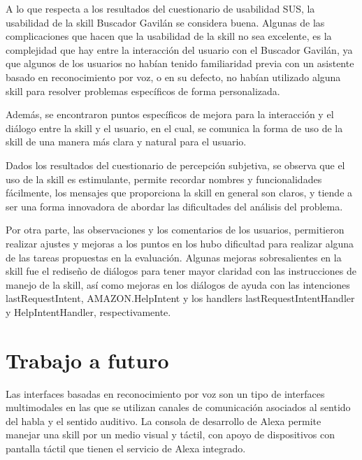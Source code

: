 A lo que respecta a los resultados del cuestionario de usabilidad SUS, la usabilidad de la skill Buscador Gavilán se considera buena. Algunas de las complicaciones que hacen que la usabilidad de la skill no sea excelente, es la complejidad que hay entre la interacción del usuario con el Buscador Gavilán, ya que algunos de los usuarios no habían tenido familiaridad previa con un asistente basado en reconocimiento por voz, o en su defecto, no habían utilizado alguna skill para resolver problemas específicos de forma personalizada.

Además, se encontraron puntos específicos de mejora para la interacción y el diálogo entre la skill y el usuario, en el cual, se comunica la forma de uso de la skill de una manera más clara y natural para el usuario.

Dados los resultados del cuestionario de percepción subjetiva, se observa que el uso de la skill es estimulante, permite recordar nombres y funcionalidades fácilmente, los mensajes que proporciona la skill en general son claros, y tiende a ser una forma innovadora de abordar las dificultades del análisis del problema.

Por otra parte, las observaciones y los comentarios de los usuarios, permitieron realizar ajustes y mejoras a los puntos en los hubo dificultad para realizar alguna de las tareas propuestas en la evaluación. Algunas mejoras sobresalientes en la skill fue el rediseño de diálogos para tener mayor claridad con las instrucciones de manejo de la skill, así como mejoras en los diálogos de ayuda con las intenciones lastRequestIntent, AMAZON.HelpIntent y los handlers lastRequestIntentHandler y HelpIntentHandler, respectivamente.


\section{Trabajo a futuro}
\label{TrabajoFuturocapV}

Las interfaces basadas en reconocimiento por voz son un tipo de interfaces multimodales en las que se utilizan canales de comunicación asociados al sentido del habla y el sentido auditivo. La consola de desarrollo de Alexa permite manejar una skill por un medio visual y táctil, con apoyo de dispositivos con pantalla táctil que tienen el servicio de Alexa integrado.

